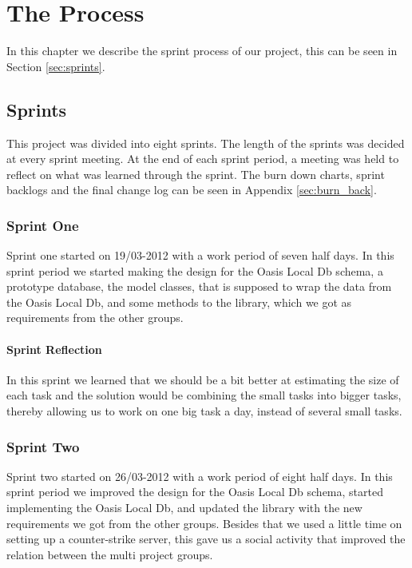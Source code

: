 \chapter{The Process}
\label{ch:SprintProcess}
In this chapter we describe the sprint process of our project, this can be seen in Section \vref{sec:sprints}.

\section{Sprints}
\label{sec:sprints}
This project was divided into eight sprints. The length of the sprints was decided at every sprint meeting. At the end of each sprint period, a meeting was held to reflect on what was learned through the sprint. The burn down charts, sprint backlogs and the final change log can be seen in Appendix \vref{sec:burn_back}.

\subsection{Sprint One}
Sprint one started on 19/03-2012 with a work period of seven half days. In this sprint period we started making the design for the Oasis Local Db schema, a prototype database, the model classes, that is supposed to wrap the data from the Oasis Local Db, and some methods to the library, which we got as requirements from the other groups.

\subsubsection{Sprint Reflection}
In this sprint we learned that we should be a bit better at estimating the size of each task and the solution would be combining the small tasks into bigger tasks, thereby allowing us to work on one big task a day, instead of several small tasks.

\subsection{Sprint Two}
Sprint two started on 26/03-2012 with a work period of eight half days. In this sprint period we improved the design for the Oasis Local Db schema, started implementing the Oasis Local Db, and updated the library with the new requirements we got from the other groups. 
Besides that we used a little time on setting up a counter-strike server, this gave us a social activity that improved the relation between the multi project groups.

